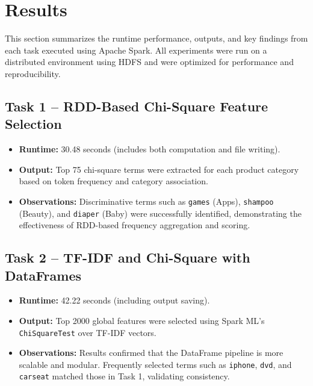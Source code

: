 \documentclass[12pt]{article}
\begin{document}
\clearpage
\section{Results}

This section summarizes the runtime performance, outputs, and key findings from each task executed using Apache Spark. All experiments were run on a distributed environment using HDFS and were optimized for performance and reproducibility.

\subsection{Task 1 – RDD-Based Chi-Square Feature Selection}
\begin{itemize}
  \item \textbf{Runtime:} 30.48 seconds (includes both computation and file writing).
  \item \textbf{Output:} Top 75 chi-square terms were extracted for each product category based on token frequency and category association.
  \item \textbf{Observations:} Discriminative terms such as \texttt{games} (Apps), \texttt{shampoo} (Beauty), and \texttt{diaper} (Baby) were successfully identified, demonstrating the effectiveness of RDD-based frequency aggregation and scoring.
\end{itemize}

\subsection{Task 2 – TF-IDF and Chi-Square with DataFrames}
\begin{itemize}
  \item \textbf{Runtime:} 42.22 seconds (including output saving).
  \item \textbf{Output:} Top 2000 global features were selected using Spark ML’s \texttt{ChiSquareTest} over TF-IDF vectors.
  \item \textbf{Observations:} Results confirmed that the DataFrame pipeline is more scalable and modular. Frequently selected terms such as \texttt{iphone}, \texttt{dvd}, and \texttt{carseat} matched those in Task 1, validating consistency.
\end{itemize}
\end{document}

